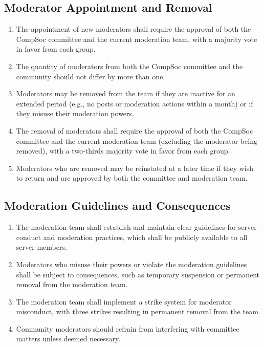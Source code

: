 \subsection{Moderator Appointment and Removal}
\begin{enumerate}
    \item The appointment of new moderators shall require the approval of both the CompSoc committee and the current moderation team, with a majority vote in favor from each group.
    \item The quantity of moderators from both the CompSoc committee and the community should not differ by more than one.
    \item Moderators may be removed from the team if they are inactive for an extended period (e.g., no posts or moderation actions within a month) or if they misuse their moderation powers.
    \item The removal of moderators shall require the approval of both the CompSoc committee and the current moderation team (excluding the moderator being removed), with a two-thirds majority vote in favor from each group.
    \item Moderators who are removed may be reinstated at a later time if they wish to return and are approved by both the committee and moderation team.
\end{enumerate}

\subsection{Moderation Guidelines and Consequences}
\begin{enumerate}
    \item The moderation team shall establish and maintain clear guidelines for server conduct and moderation practices, which shall be publicly available to all server members.
    \item Moderators who misuse their powers or violate the moderation guidelines shall be subject to consequences, such as temporary suspension or permanent removal from the moderation team.
    \item The moderation team shall implement a strike system for moderator misconduct, with three strikes resulting in permanent removal from the team.
    \item Community moderators should refrain from interfering with committee matters unless deemed necessary.
\end{enumerate}

